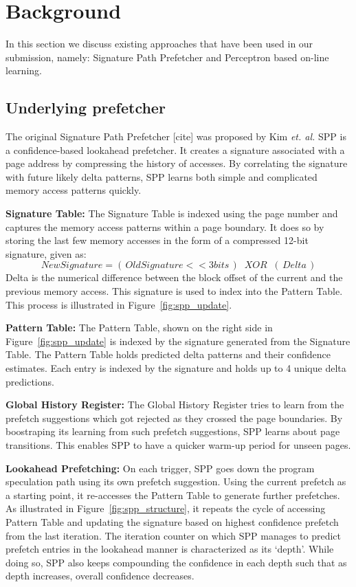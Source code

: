 \section{Background}
\label{Background}
In this section we discuss existing approaches that have been 
used in our submission, namely: Signature Path Prefetcher and Perceptron 
based on-line learning.

\subsection{Underlying prefetcher}
\label{sec:Background-SPP}
The original Signature Path Prefetcher [cite] was proposed by Kim 
{\em et. al.} SPP is a confidence-based lookahead prefetcher. 
It creates a signature associated with a page address by compressing 
the history of accesses. By correlating the signature with future 
likely delta patterns, SPP learns both simple and complicated 
memory access patterns quickly.

\noindent \textbf{Signature Table:} 
The Signature Table is indexed using the page number and captures the memory 
access patterns within a page boundary. It does so by storing the last few
memory accesses in the form of a compressed 12-bit signature, given as:
$$New Signature = (\,Old Signature << 3 bits\,) \;\;XOR\;\; (\,Delta\,)$$ 
Delta is the numerical difference between the block offset of the current 
and the previous memory access. This signature is used to index into the 
Pattern Table. This process is illustrated in Figure~\ref{fig:spp_update}.

\noindent \textbf{Pattern Table:} 
The Pattern Table, shown on the right side in Figure~\ref{fig:spp_update} 
is indexed by the signature generated from the Signature Table. The Pattern 
Table holds predicted delta patterns and their confidence estimates. Each 
entry is indexed by the signature and holds up to 4 unique delta predictions.

\noindent \textbf{Global History Register:} 
The Global History Register tries to learn from the prefetch suggestions which
got rejected as they crossed the page boundaries. By boostraping its learning
from such prefetch suggestions, SPP learns about page transitions. This enables 
SPP to have a quicker warm-up period for unseen pages. 

\noindent \textbf{Lookahead Prefetching:} On each trigger, SPP goes
down the program speculation path using its own prefetch suggestion.
Using the current prefetch as a starting point, it re-accesses the Pattern
Table to generate further prefetches. As illustrated in
Figure~\ref{fig:spp_structure}, it repeats the cycle of accessing
Pattern Table and updating the signature based on highest confidence
prefetch from the last iteration. The iteration counter on which SPP
manages to predict prefetch entries in the lookahead manner is
characterized as its `depth'. While doing so, SPP also keeps
compounding the confidence in each depth such that as depth increases,
overall confidence decreases.

